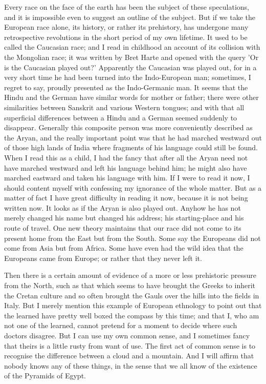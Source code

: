 Every race on the face of the earth has been the subject of these speculations, and it is impossible even to suggest an outline of the subject. But if we take the European race alone, its history, or rather its prehistory, has undergone many retrospective revolutions in the short period of my own lifetime. It used to be called the Caucasian race; and I read in childhood an account of its collision with the Mongolian race; it was written by Bret Harte and opened with the query 'Or is the Caucasian played out?' Apparently the Caucasian was played out, for in a very short time he had been turned into the Indo-European man; sometimes, I regret to say, proudly presented as the Indo-Germanic man. It seems that the Hindu and the German have similar words for mother or father; there were other similarities between Sanskrit and various Western tongues; and with that all superficial differences between a Hindu and a German seemed suddenly to disappear. Generally this composite person was more conveniently described as the Aryan, and the really important point was that he had marched westward out of those high lands of India where fragments of his language could still be found. When I read this as a child, I had the fancy that after all the Aryan need not have marched westward and left his language behind him; he might also have marched eastward and taken his language with him. If I were to read it now, I should content myself with confessing my ignorance of the whole matter. But as a matter of fact I have great difficulty in reading it now, because it is not being written now. It looks as if the Aryan is also played out. Anyhow he has not merely changed his name but changed his address; his starting-place and his route of travel. One new theory maintains that our race did not come to its present home from the East but from the South. Some say the Europeans did not come from Asia but from Africa. Some have even had the wild idea that the Europeans came from Europe; or rather that they never left it.

Then there is a certain amount of evidence of a more or less prehistoric pressure from the North, such as that which seems to have brought the Greeks to inherit the Cretan culture and so often brought the Gauls over the hills into the fields in Italy. But I merely mention this example of European ethnology to point out that the learned have pretty well boxed the compass by this time; and that I, who am not one of the learned, cannot pretend for a moment to decide where such doctors disagree. But I can use my own common sense, and I sometimes fancy that theirs is a little rusty from want of use. The first act of common sense is to recognise the difference between a cloud and a mountain. And I will affirm that nobody knows any of these things, in the sense that we all know of the existence of the Pyramids of Egypt.

